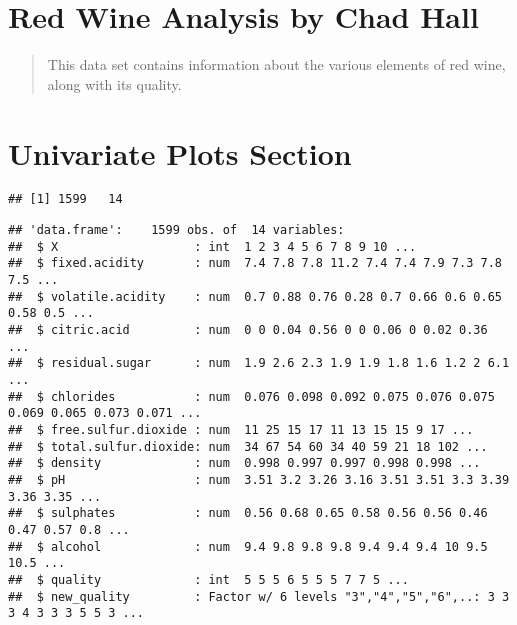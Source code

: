 \documentclass[]{article}
\title{}
\author{}
\date{}
\begin{document}
\hypertarget{red-wine-analysis-by-chad-hall}{%
\section{Red Wine Analysis by Chad
Hall}\label{red-wine-analysis-by-chad-hall}}

\begin{quote}
This data set contains information about the various elements of red
wine, along with its quality.
\end{quote}

\hypertarget{univariate-plots-section}{%
\section{Univariate Plots Section}\label{univariate-plots-section}}

\begin{verbatim}
## [1] 1599   14
\end{verbatim}

\begin{verbatim}
## 'data.frame':    1599 obs. of  14 variables:
##  $ X                   : int  1 2 3 4 5 6 7 8 9 10 ...
##  $ fixed.acidity       : num  7.4 7.8 7.8 11.2 7.4 7.4 7.9 7.3 7.8 7.5 ...
##  $ volatile.acidity    : num  0.7 0.88 0.76 0.28 0.7 0.66 0.6 0.65 0.58 0.5 ...
##  $ citric.acid         : num  0 0 0.04 0.56 0 0 0.06 0 0.02 0.36 ...
##  $ residual.sugar      : num  1.9 2.6 2.3 1.9 1.9 1.8 1.6 1.2 2 6.1 ...
##  $ chlorides           : num  0.076 0.098 0.092 0.075 0.076 0.075 0.069 0.065 0.073 0.071 ...
##  $ free.sulfur.dioxide : num  11 25 15 17 11 13 15 15 9 17 ...
##  $ total.sulfur.dioxide: num  34 67 54 60 34 40 59 21 18 102 ...
##  $ density             : num  0.998 0.997 0.997 0.998 0.998 ...
##  $ pH                  : num  3.51 3.2 3.26 3.16 3.51 3.51 3.3 3.39 3.36 3.35 ...
##  $ sulphates           : num  0.56 0.68 0.65 0.58 0.56 0.56 0.46 0.47 0.57 0.8 ...
##  $ alcohol             : num  9.4 9.8 9.8 9.8 9.4 9.4 9.4 10 9.5 10.5 ...
##  $ quality             : int  5 5 5 6 5 5 5 7 7 5 ...
##  $ new_quality         : Factor w/ 6 levels "3","4","5","6",..: 3 3 3 4 3 3 3 5 5 3 ...
\end{verbatim}
\end{document}
